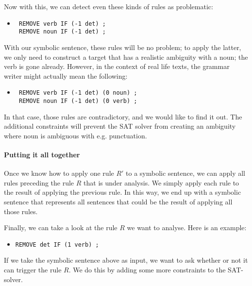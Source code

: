 Now with this, we can detect even these kinds of rules as problematic:

 \begin{itemize}
 \item[] \begin{verbatim}
 REMOVE verb IF (-1 det) ;
 REMOVE noun IF (-1 det) ;
 \end{verbatim}
 \end{itemize}

 With our symbolic sentence, these rules will be no problem; to apply the latter, we only need to construct a target that has a realistic ambiguity with a noun; the verb is gone already.
 However, in the context of real life texts, the grammar writer might actually mean the following:

 \begin{itemize}
 \item[] \begin{verbatim}
 REMOVE verb IF (-1 det) (0 noun) ;
 REMOVE noun IF (-1 det) (0 verb) ;
 \end{verbatim}
 \end{itemize}

 In that case, those rules are contradictory, and we would like to find it out. The additional constraints will prevent the SAT solver from creating an ambiguity where noun is ambiguous with e.g. punctuation.


\paragraph{Putting it all together}

Once we know how to apply one rule $R'$ to a symbolic sentence, we can apply all rules preceding the rule $R$ that is under analysis. We simply apply each rule to the result of applying the previous rule. In this way, we end up with a symbolic sentence that represents all sentences that could be the result of applying all those rules.

Finally, we can take a look at the rule $R$ we want to analyse. Here is an example:
\begin{itemize}
\item[] \texttt{REMOVE det IF (1 verb) ;}
\end{itemize}
If we take the symbolic sentence above as input, we want to ask whether or not it can trigger the rule $R$. We do this by adding some more constraints to the SAT-solver.

